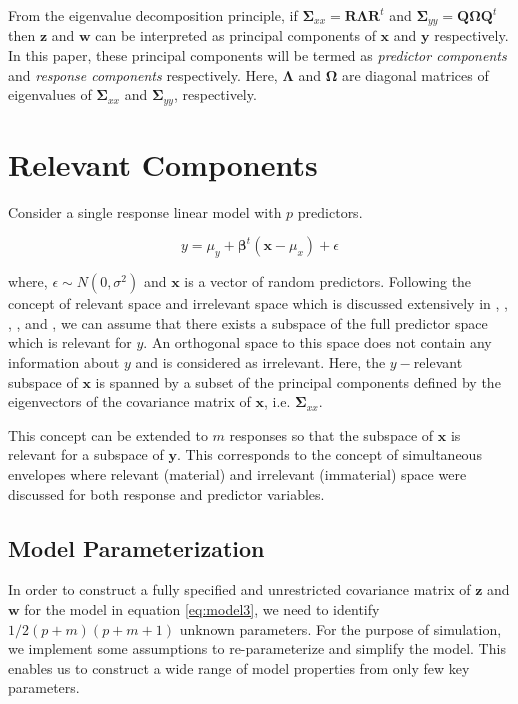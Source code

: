 \documentclass[review]{elsarticle}
\theoremstyle{definition}
\theoremstyle{definition}
\theoremstyle{remark}
\begin{document}
From the eigenvalue decomposition principle, if
\(\boldsymbol{\Sigma}_{xx} = \mathbf{R}\boldsymbol{\Lambda}\mathbf{R}^t\)
and
\(\boldsymbol{\Sigma}_{yy} = \mathbf{Q}\boldsymbol{\Omega}\mathbf{Q}^t\)
then \(\mathbf{z}\) and \(\mathbf{w}\) can be interpreted as principal
components of \(\mathbf{x}\) and \(\mathbf{y}\) respectively. In this
paper, these principal components will be termed as \emph{predictor
components} and \emph{response components} respectively. Here,
\(\boldsymbol{\Lambda}\) and \(\boldsymbol{\Omega}\) are diagonal
matrices of eigenvalues of \(\boldsymbol{\Sigma}_{xx}\) and
\(\boldsymbol{\Sigma}_{yy}\), respectively.

\section{Relevant Components}\label{relevant-components}

Consider a single response linear model with \(p\) predictors.

\[y = \mu_y + \boldsymbol{\beta}^t\left(\mathbf{x} - \mu_x\right) + \epsilon\]

where, \(\epsilon \sim N(0, \sigma^2)\) and \(\mathbf{x}\) is a vector
of random predictors. Following the concept of relevant space and
irrelevant space which is discussed extensively in
\citet{helland1994comparison}, \citet{Helland2000},
\citet{helland2012near}, \citet{cook2013envelopes}, and
\citet{saebo2015simrel}, we can assume that there exists a subspace of
the full predictor space which is relevant for \(y\). An orthogonal
space to this space does not contain any information about \(y\) and is
considered as irrelevant. Here, the \(y-\)relevant subspace of
\(\mathbf{x}\) is spanned by a subset of the principal components
defined by the eigenvectors of the covariance matrix of \(\mathbf{x}\),
i.e. \(\boldsymbol{\Sigma}_{xx}\).

This concept can be extended to \(m\) responses so that the subspace of
\(\mathbf{x}\) is relevant for a subspace of \(\mathbf{y}\). This
corresponds to the concept of simultaneous envelopes
\citep{cook2015simultaneous} where relevant (material) and irrelevant
(immaterial) space were discussed for both response and predictor
variables.

\subsection{Model Parameterization}\label{model-parameterization}

In order to construct a fully specified and unrestricted covariance
matrix of \(\mathbf{z}\) and \(\mathbf{w}\) for the model in equation
\eqref{eq:model3}, we need to identify \(1/2 (p+m)(p+m+1)\) unknown
parameters. For the purpose of simulation, we implement some assumptions
to re-parameterize and simplify the model. This enables us to construct
a wide range of model properties from only few key parameters.
\end{document}
